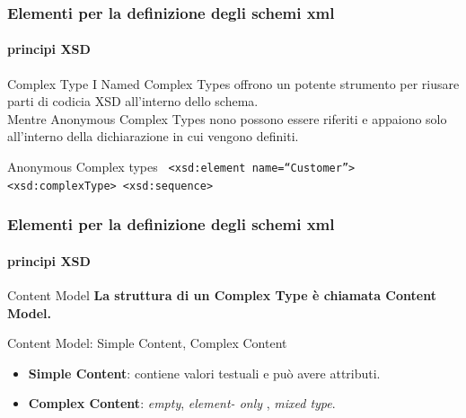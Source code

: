 \begin{frame}
	\frametitle{Elementi per la definizione degli schemi xml}
	\framesubtitle{principi XSD}
	\addtocounter{nframe}{1}

	\begin{block}{Complex Type}
		I 
		Named Complex Types offrono un potente strumento per riusare parti di codicia XSD all'interno dello schema.
		\\ Mentre Anonymous Complex Types nono possono essere riferiti e appaiono solo all'interno della dichiarazione in cui vengono definiti.

	\end{block}

	\begin{block}{Anonymous Complex types}
		\texttt{
			<xsd:element name=``Customer''>
			<xsd:complexType>
			<xsd:sequence>
		}
	\end{block}
\end{frame}


\begin{frame}
	\frametitle{Elementi per la definizione degli schemi xml}
	\framesubtitle{principi XSD}
	\addtocounter{nframe}{1}

	\begin{block}{Content Model}
		\textbf{La struttura di un Complex Type è chiamata Content Model.}
	\end{block}

	\begin{block}{Content Model: Simple Content, Complex Content}
		\begin{itemize}
			\item \textbf{Simple Content}: contiene valori testuali e può avere attributi.
			\item \textbf{Complex Content}: \textit{empty}, \textit{element- only }, \textit{mixed type}.
		\end{itemize}
	\end{block}
\end{frame}

